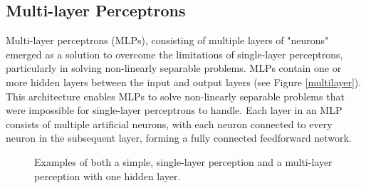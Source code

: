 \subsection{Multi-layer Perceptrons}
Multi-layer perceptrons (MLPs), consisting of multiple layers of "neurons" emerged as a solution to overcome the limitations of single-layer perceptrons, particularly in solving non-linearly separable problems. MLPs contain one or more hidden layers between the input and output layers (see Figure \ref{multilayer}). This architecture enables MLPs to solve non-linearly separable problems that were impossible for single-layer perceptrons to handle. Each layer in an MLP consists of multiple artificial neurons, with each neuron connected to every neuron in the subsequent layer, forming a fully connected feedforward network. 
\begin{figure}[H]
\centering
\begin{tcolorbox}[every float=\centering, drop shadow, title=Multi-layer Perceptrons ,colback=white,colframe=WMgreen,
  colbacktitle=WMgreen,]
  \centering
{}
  \caption{Examples of both a simple, single-layer perception and a multi-layer perception with one hidden layer.}
  \label{fig:multilayer}
 \end{tcolorbox}
\end{figure}

